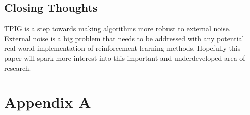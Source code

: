 \documentclass[12pt]{thesis}
\begin{document}
\section{Closing Thoughts}
TPIG is a step towards making algorithms more robust to external noise. External noise is a big problem that needs to be addressed with any potential real-world implementation of reinforcement learning methods. Hopefully this paper will spark more interest into this important and underdeveloped area of research.

\chapter{Appendix A}

%
%
%
%
%
\end{document}
